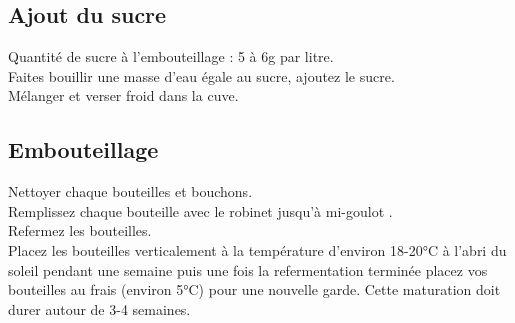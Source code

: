 \documentclass[twoside,twocolumn]{report}
\begin{document}
		\subsection{Ajout du sucre}
		Quantité de sucre à l’embouteillage : 5 à 6g par litre.\\	 
		Faites bouillir une  masse d’eau égale au sucre, ajoutez le sucre. \\
		Mélanger et verser froid dans la cuve.\\
		\subsection{Embouteillage}
		Nettoyer chaque bouteilles et bouchons.\\
		Remplissez chaque bouteille avec le robinet  jusqu’à  mi-goulot .\\
		Refermez les  bouteilles.\\
		
		Placez les bouteilles verticalement à la température d’environ 18-20°C à l'abri du soleil pendant une semaine puis une fois la refermentation terminée placez vos bouteilles au frais (environ 5°C) pour une
		nouvelle garde. Cette maturation doit durer autour de 3-4 semaines.
		
				
				
				
			

			
				
						
		
 

	
\end{document}
